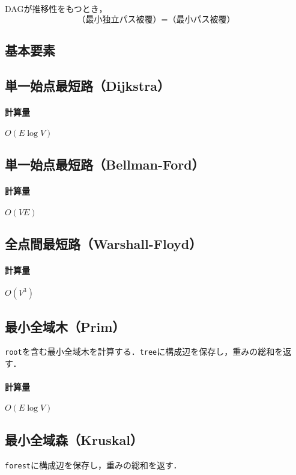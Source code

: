 \documentclass[landscape,twocolumn,9pt]{jsarticle}
\begin{document}
DAGが推移性をもつとき，
\[ \text{（最小独立パス被覆）}=\text{（最小パス被覆）} \]

\subsection{基本要素}


\subsection{単一始点最短路（Dijkstra）}
\paragraph{計算量} $O(E\log V)$


\subsection{単一始点最短路（Bellman-Ford）}
\paragraph{計算量} $O(VE)$


\subsection{全点間最短路（Warshall-Floyd）}
\paragraph{計算量} $O(V^3)$


\subsection{最小全域木（Prim）}
\texttt{root}を含む最小全域木を計算する．\texttt{tree}に構成辺を保存し，重みの総和を返す．

\paragraph{計算量} $O(E\log V)$


\subsection{最小全域森（Kruskal）}
\texttt{forest}に構成辺を保存し，重みの総和を返す．
\end{document}
